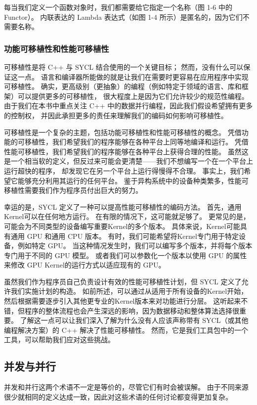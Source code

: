 每当我们定义一个函数对象时，我们都需要给它指定一个名称（图 1-6 中的 Functor）。 
内联表达的 Lambda 表达式（如图 1-4 所示）是匿名的，因为它们不需要名称。

\subsubsection{功能可移植性和性能可移植性}
可移植性是将 C++ 与 SYCL 结合使用的一个关键目标； 然而，没有什么可以保证这一点。 
语言和编译器所能做的就是让我们在需要时更容易在应用程序中实现可移植性。 
确实，更高级别（更抽象）的编程（例如特定于领域的语言、库和框架）可以提供更多的可移植性，
很大程度上是因为它们允许较少的规范性编程。 
由于我们在本书中重点关注 C++ 中的数据并行编程，因此我们假设希望拥有更多的控制权，
并因此承担更多的责任来理解我们的编码如何影响可移植性。

可移植性是一个复杂的主题，包括功能可移植性和性能可移植性的概念。 
凭借功能的可移植性，我们希望我们的程序能够在各种平台上同等地编译和运行。 
凭借性能可移植性，我们希望我们的程序能够在各种平台上获得合理的性能。 
虽然这是一个相当软的定义，但反过来可能会更清楚——我们不想编写一个在一个平台上运行超快的程序，
却发现它在另一个平台上运行得慢得不合理。 事实上，我们希望它能够充分利用其运行的任何平台。 
鉴于异构系统中的设备种类繁多，性能可移植性需要我们作为程序员付出巨大的努力。

幸运的是，SYCL 定义了一种可以提高性能可移植性的编码方法。 首先，通用Kernel可以在任何地方运行。 
在有限的情况下，这可能就足够了。 更常见的是，可能会为不同类型的设备编写重要Kernel的多个版本。 
具体来说，Kernel可能具有通用 GPU 和通用 CPU 版本。 有时，我们可能希望将Kernel专门用于特定设备，例如特定 GPU。 
当这种情况发生时，我们可以编写多个版本，并将每个版本专门用于不同的 GPU 模型。 
或者我们可以参数化一个版本以使用 GPU 的属性来修改 GPU Kernel的运行方式以适应现有的 GPU。

虽然我们作为程序员自己负责设计有效的性能可移植性计划，但 SYCL 定义了允许我们实施计划的构造。 
如前所述，可以通过从适用于所有设备的Kernel开始，然后根据需要逐步引入其他更专业的Kernel版本来对功能进行分层。 
这听起来不错，但程序的整体流程也会产生深远的影响，因为数据移动和整体算法选择很重要。 
了解这一点可以让我们深入了解为什么没有人应该声称带有 SYCL（或其他编程解决方案）的 C++ 解决了性能可移植性。 
然而，它是我们工具包中的一个工具，可以帮助我们应对这些挑战。


\subsection{并发与并行}
并发和并行这两个术语不一定是等价的，尽管它们有时会被误解。 
由于不同来源很少就相同的定义达成一致，因此对这些术语的任何讨论都变得更加复杂。

